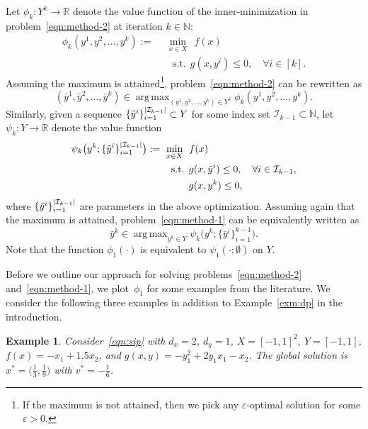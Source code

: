 \documentclass{article}
\DeclareMathOperator*{\argmax}{arg\,max}
\DeclarePairedDelimiter\abs{\lvert}{\rvert}%
\newcommand{\N}{\mathbb{N}}
\newcommand{\1}[1]{\mathds{1}\left[#1\right]}
\newtheorem{example}{Example}
\begin{document}
Let $\phi_k: Y^k \to \mathbb{R}$ denote the value function of the inner-minimization in problem~\eqref{eqn:method-2} at iteration $k \in \N$: 
\begin{align}
\label{eqn:method-2_valuefn}
\phi_k(y^1,y^2,\dots,y^k) := \:\: & \min_{x \in X} \:\: f(x) \\
& \:\:\:\text{s.t.} \:\: g(x,y^i) \leq 0, \quad \forall i \in [k]. \nonumber
\end{align}
Assuming the maximum is attained\footnote{\label{foot:max_unattainable}If the maximum is not attained, then we pick any $\varepsilon$-optimal solution for some $\varepsilon > 0$.}, problem~\eqref{eqn:method-2} can be rewritten as
\begin{equation*} 
(\bar{y}^1,\bar{y}^2,\dots,\bar{y}^k) \in \argmax_{(y^1,y^2,\dots,y^k) \in Y^k} \phi_k(y^1,y^2,\dots,y^k).
\end{equation*}
Similarly, given a sequence $\{\tilde{y}^i\}_{i=1}^{\abs{\mathcal{I}_{k-1}}} \subset Y$ for some index set $\mathcal{I}_{k-1} \subset \N$, let $\psi_k: Y \to \mathbb{R}$ denote the value function 
\begin{align}
\label{eqn:method-1_valuefn}
\psi_k\bigl(y^k;\{\tilde{y}^i\}_{i=1}^{\abs{\mathcal{I}_{k-1}}}\bigr) := \:\: & \min_{x \in X} \:\: f(x) \\
& \:\:\:\text{s.t.} \:\: g(x,\tilde{y}^i) \leq 0, \quad \forall i \in \mathcal{I}_{k-1}, \nonumber \\
& \quad\quad\:\: g(x,y^k) \leq 0, \nonumber
\end{align}%
where $\{\tilde{y}^i\}_{i=1}^{\abs{\mathcal{I}_{k-1}}}$ are parameters in the above optimization.
Assuming again that the maximum is attained, problem~\eqref{eqn:method-1} can be equivalently written as
\begin{equation*} 
\bar{y}^k \in \argmax_{y^k \in Y} \psi_k\bigl(y^k;\{\bar{y}^i\}_{i=1}^{k-1}\bigr).
\end{equation*}
Note that the function $\phi_1(\cdot)$ is equivalent to $\psi_1(\cdot;\emptyset)$ on $Y$.

Before we outline our approach for solving problems~\eqref{eqn:method-2} and~\eqref{eqn:method-1}, we plot~$\phi_1$ for some examples from the literature.
We consider the following three examples in addition to Example~\ref{exm:dp} in the introduction.


\begin{example}{\citep[Ex.\ 2.1]{seidel2020adaptive}}
\label{exm:seidel}
Consider~\eqref{eqn:sip} with $d_x = 2$, $d_y = 1$, $X = [-1,1]^2$, $Y = [-1,1]$, $f(x) = -x_1 + 1.5x_2$, and $g(x,y) = -y^2_1 + 2y_1x_1 - x_2$.
The global solution is $x^* = \bigl( \frac{1}{3}, \frac{1}{9} \bigr)$ with $v^* = -\frac{1}{6}$.
\end{example}
\end{document}
